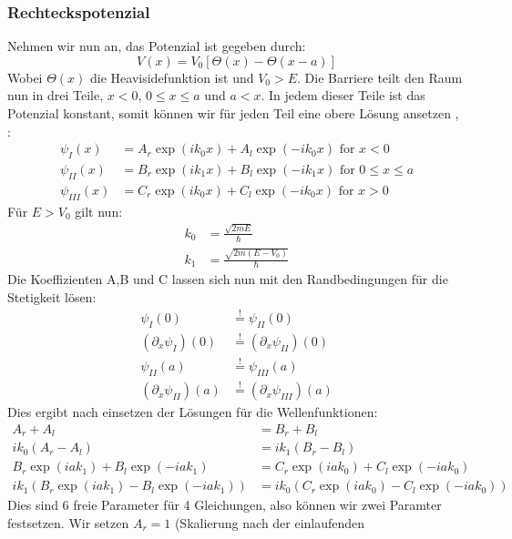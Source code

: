 \subsubsection{Rechteckspotenzial}
Nehmen wir nun an, das Potenzial ist gegeben durch:
\begin{equation}
    V(x) = V_0 \left [ \Theta(x) - \Theta(x-a) \right ] 
\end{equation}
Wobei $\Theta(x)$ die Heavisidefunktion ist und $V_0 > E$.
Die Barriere teilt den Raum nun in drei Teile, $x<0$, $0\leqslant x\leqslant a$ und $a<x$.
In jedem dieser Teile ist das Potenzial konstant, somit können wir für jeden Teil eine
obere Lösung ansetzen \cite{demtroder2000experimentalphysik},
\cite{landau1991quantenmechanik}:
\begin{align}
    \psi_I(x)    &= A_r \exp(ik_0x) + A_l  \exp(-ik_0x) \mbox{ for } x<0\\
    \psi_{II}(x) &= B_r \exp(ik_1x) + B_l  \exp(-ik_1x) \mbox{ for } 0 \leqslant x \leqslant a\\
    \psi_{III}(x)&= C_r \exp(ik_0x) + C_l  \exp(-ik_0x) \mbox{ for } x>0
\end{align}
Für $E>V_0$ gilt nun:
\begin{align}
    k_0 &= \frac{\sqrt{2mE}}{\hbar}\\
    k_1 &= \frac{\sqrt{2m(E-V_0)}}{\hbar}
\end{align}
Die Koeffizienten A,B und C lassen sich nun mit den Randbedingungen
für die Stetigkeit lösen:
\begin{align}
    \psi_I(0)&\overset{!}{=} \psi_{II}(0)\\
    (\partial_x\psi_I)(0)&\overset{!}{=} (\partial_x\psi_{II})(0)\\
    \psi_{II}(a)&\overset{!}{=} \psi_{III}(a)\\
    (\partial_x\psi_{II})(a)&\overset{!}{=} (\partial_x\psi_{III})(a)
\end{align}
Dies ergibt nach einsetzen der Lösungen für die Wellenfunktionen:
\begin{align}
  A_r + A_l &= B_r + B_l \\
  ik_0(A_r-A_l) &= ik_1(B_r-B_l)\\
  B_r\exp(iak_1)+B_l\exp(-iak_1)&=C_r \exp(iak_0)+C_l\exp(-iak_0)\\
  ik_1(B_r\exp(iak_1) - B_l\exp(-iak_1))&=ik_0(C_r\exp(iak_0)-C_l\exp(-iak_0))
\end{align}
Dies sind 6 freie Parameter für 4 Gleichungen, also können wir zwei 
Paramter festsetzen. Wir setzen $A_r =1$ (Skalierung nach der einlaufenden
